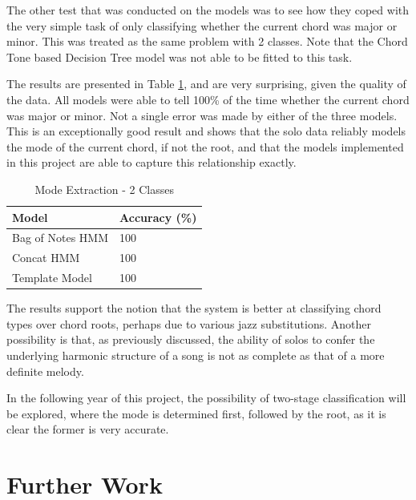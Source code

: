 \documentclass[bsc,singlespacing,parskip,deptreport,twoside,frontabs]{infthesis}
\begin{document}
The other test that was conducted on the models was to see how they coped with the very simple task of only classifying whether the current chord was major or minor. This was treated as the same problem with 2 classes. Note that the Chord Tone based Decision Tree model was not able to be fitted to this task.

The results are presented in Table \ref{2}, and are very surprising, given the quality of the data. All models were able to tell 100\% of the time whether the current chord was major or minor. Not a single error was made by either of the three models. This is an exceptionally good result and shows that the solo data reliably models the mode of the current chord, if not the root, and that the models implemented in this project are able to capture this relationship exactly.

\begin{table}
\centering
\caption{Mode Extraction - 2 Classes}
\label{2}
\begin{tabular}{l|l}
Model               & Accuracy (\%) \\ \hline
Bag of Notes HMM    & 100           \\
Concat HMM          & 100          \\
Template Model      & 100         
\end{tabular}
\end{table}

The results support the notion that the system is better at classifying chord types over chord roots, perhaps due to various jazz substitutions. Another possibility is that, as previously discussed, the ability of solos to confer the underlying harmonic structure of a song is not as complete as that of a more definite melody.

In the following year of this project, the possibility of two-stage classification will be explored, where the mode is determined first, followed by the root, as it is clear the former is very accurate.

\chapter{Further Work}


\end{document}
